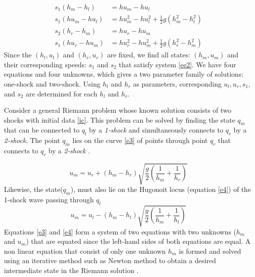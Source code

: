 \documentclass[12pt,a4paper]{article}
\begin{document}
 \begin{equation}
 	\begin{aligned}
 		s_1(h_{m} - h_{l}) & = hu_{m} - hu_{l} \\
 		s_1(hu_{m} - hu_{l})  &= hu_{m}^{2} - hu_{l}^{2} + \frac{1}{2}g(h_{m}^{2} - h_{l}^2)\\
 		s_2(h_{r} - h_{m})  &=  hu_{r} - hu_{m}\\
 		s_1(hu_{r} - hu_{m})  &= hu_{r}^{2} - hu_{m}^{2} + \frac{1}{2}g(h_{r}^{2} - h_{m}^2)
 	\end{aligned}
 	\label{ee2}
 \end{equation}
 Since the $(h_l,u_l)$ and $(h_r,u_r)$ are fixed, we find all states: $(h_m,u_m)$  and their corresponding speeds: $s_1$ and $s_2$ that satisfy system  \eqref{ee2}. We have four equations and four unknowns, which gives a two parameter family of solutions: one-shock and two-shock. Using $h_l$ and $h_r$ as parameters, corresponding $u_l,u_r,s_1, $and $s_2$ are determined for each $h_l$ and $h_r$.
 
 
 Consider a general Riemann problem whose known solution consists of two shocks with initial data \eqref{ic}. This problem can be solved by finding the state $q_m$ that can be connected to $q_l$ by a {\em 1-shock} and simultaneously connects to $q_r$ by a {\em 2-shock}. The point $q_m$ lies on the  curve \eqref{e3} of points  through  point $q_r$  that connects to $q_r$ by a {\em 2-shock}  \citep{be-ge-le-ma:2011}.
 
 \begin{equation}
 	u_{m} = u_{r} + (h_{m} - h_{r})\sqrt{\frac{g}{2}\left(\frac{1}{h_m} + \frac{1}{h_r} \right)}
 	\label{e3}
 \end{equation}
 Likewise, the state($q_m$), must also lie on the Hugonoit locus (equation \eqref{e4}) of the 1-shock wave passing through $q_l$
 \begin{equation}
 	u_{m} = u_{l} - (h_{m} - h_{l})\sqrt{\frac{g}{2}\left(\frac{1}{h_m} + \frac{1}{h_l} \right)}
 	\label{e4}
 \end{equation}
 Equations \eqref{e3} and \eqref{e4} form a system of two equations with two unknowns ($h_m$ and $u_m$) that are equated since the left-hand sides of both equations are equal. A non linear equation that consist of only one unknown $h_m$ is formed and solved using an iterative method such as Newton method to obtain a desired intermediate state in the Riemann solution \citep{le-ge-be:2011}.
 
\end{document}
